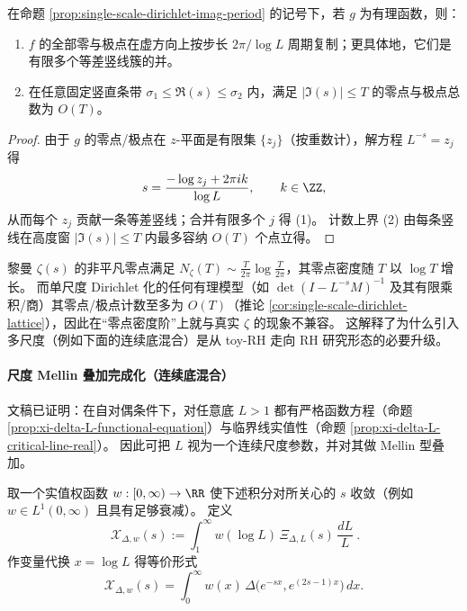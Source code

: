 \begin{corollary}[零/极点的梳齿晶格与线性计数上界]\label{cor:single-scale-dirichlet-lattice}
在命题 \ref{prop:single-scale-dirichlet-imag-period} 的记号下，若 \(g\) 为有理函数，则：
\begin{enumerate}
  \item \(f\) 的全部零与极点在虚方向上按步长 \(2\pi/\log L\) 周期复制；更具体地，它们是有限多个等差竖线簇的并。
  \item 在任意固定竖直条带 \(\sigma_1\le \Re(s)\le \sigma_2\) 内，满足 \(|\Im(s)|\le T\) 的零点与极点总数为 \(O(T)\)。
\end{enumerate}
\end{corollary}
\begin{proof}
由于 \(g\) 的零点/极点在 \(z\)-平面是有限集 \(\{z_j\}\)（按重数计），解方程 \(L^{-s}=z_j\) 得
\[
s=\frac{-\log z_j+2\pi i k}{\log L},\qquad k\in\ZZ,
\]
从而每个 \(z_j\) 贡献一条等差竖线；合并有限多个 \(j\) 得 (1)。
计数上界 (2) 由每条竖线在高度窗 \(|\Im(s)|\le T\) 内最多容纳 \(O(T)\) 个点立得。
\end{proof}

\begin{remark}\label{rem:single-scale-dirichlet-obstruction}
黎曼 \(\zeta(s)\) 的非平凡零点满足 \(N_\zeta(T)\sim \frac{T}{2\pi}\log\frac{T}{2\pi}\)，其零点密度随 \(T\) 以 \(\log T\) 增长。
而单尺度 Dirichlet 化的任何有理模型（如 \(\det(I-L^{-s}M)^{-1}\) 及其有限乘积/商）其零点/极点计数至多为 \(O(T)\)（推论 \ref{cor:single-scale-dirichlet-lattice}），因此在“零点密度阶”上就与真实 \(\zeta\) 的现象不兼容。
这解释了为什么引入多尺度（例如下面的连续底混合）是从 toy-RH 走向 RH 研究形态的必要升级。
\end{remark}



\paragraph{尺度 Mellin 叠加完成化（连续底混合）}
文稿已证明：在自对偶条件下，对任意底 \(L>1\) 都有严格函数方程（命题 \ref{prop:xi-delta-L-functional-equation}）与临界线实值性（命题 \ref{prop:xi-delta-L-critical-line-real}）。
因此可把 \(L\) 视为一个连续尺度参数，并对其做 Mellin 型叠加。

\begin{definition}[尺度叠加完成化]\label{def:xi-scale-mellin-superposition}
取一个实值权函数 \(w:[0,\infty)\to\RR\) 使下述积分对所关心的 \(s\) 收敛（例如 \(w\in L^1(0,\infty)\) 且具有足够衰减）。
定义
\[
\boxed{\ \mathcal X_{\Delta,w}(s):=\int_{1}^{\infty} w(\log L)\,\Xi_{\Delta,L}(s)\,\frac{dL}{L}\ }.
\]
作变量代换 \(x=\log L\) 得等价形式
\[
\mathcal X_{\Delta,w}(s)=\int_0^\infty w(x)\,\Delta\!\bigl(e^{-sx},e^{(2s-1)x}\bigr)\,dx.
\]
\end{definition}

